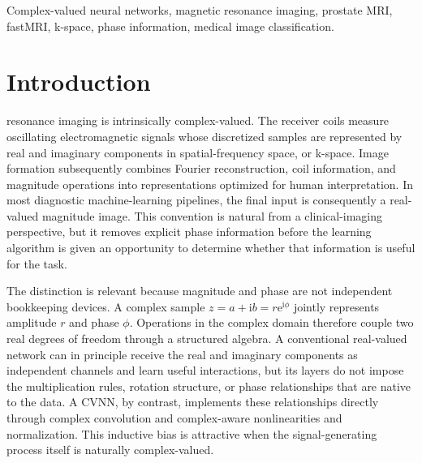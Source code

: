 \documentclass[journal]{IEEEtran}
\begin{document}
\begin{IEEEkeywords}
Complex-valued neural networks, magnetic resonance imaging, prostate MRI, fastMRI, k-space, phase information, medical image classification.
\end{IEEEkeywords}

\IEEEpeerreviewmaketitle
\acresetall

\section{Introduction}\label{sec:introduction}
 resonance imaging is intrinsically complex-valued. The receiver coils measure oscillating electromagnetic signals whose discretized samples are represented by real and imaginary components in spatial-frequency space, or k-space. Image formation subsequently combines Fourier reconstruction, coil information, and magnitude operations into representations optimized for human interpretation. In most diagnostic machine-learning pipelines, the final input is consequently a real-valued magnitude image. This convention is natural from a clinical-imaging perspective, but it removes explicit phase information before the learning algorithm is given an opportunity to determine whether that information is useful for the task.

The distinction is relevant because magnitude and phase are not independent bookkeeping devices. A complex sample $z=a+\mathrm{i}b=r\mathrm{e}^{\mathrm{i}\phi}$ jointly represents amplitude $r$ and phase $\phi$. Operations in the complex domain therefore couple two real degrees of freedom through a structured algebra. A conventional real-valued network can in principle receive the real and imaginary components as independent channels and learn useful interactions, but its layers do not impose the multiplication rules, rotation structure, or phase relationships that are native to the data. A \ac{CVNN}, by contrast, implements these relationships directly through complex convolution and complex-aware nonlinearities and normalization. This inductive bias is attractive when the signal-generating process itself is naturally complex-valued.
\end{document}
